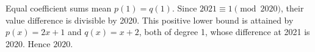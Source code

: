 Equal coefficient sums mean $p(1)=q(1)$. Since $2021\equiv1\pmod{2020}$, their value difference is divisible by 2020. This positive lower bound is attained by $p(x)=2x+1$ and $q(x)=x+2$, both of degree 1, whose difference at 2021 is 2020. Hence $\boxed{2020}$.
